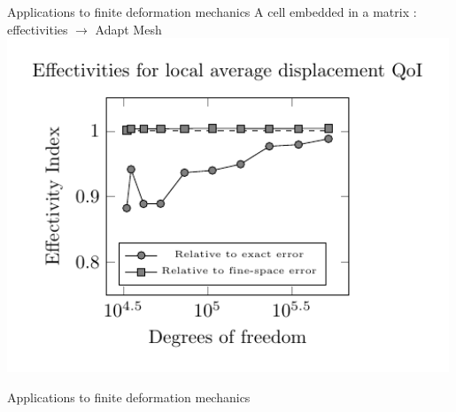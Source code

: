 \documentclass[fleqn]{beamer}
\begin{document}
\begin{frame}{Applications to finite deformation mechanics}
{A cell embedded in a matrix : effectivities}
\scriptsize
$\rightarrow$ Adapt Mesh \\
\includegraphics[width=0.99\textwidth]{../img/mech_glial_effectivity_plot}
\end{frame}


\begin{frame}{Applications to finite deformation mechanics}
\end{frame}
\end{document}

